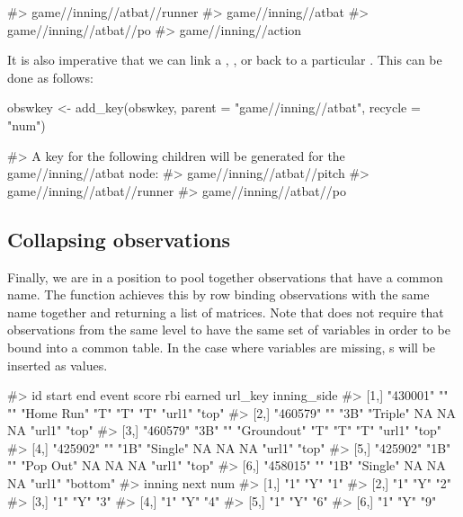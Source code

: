 \begin{article}
\begin{Schunk}
\begin{Soutput}
#> game//inning//atbat//runner
#> game//inning//atbat
#> game//inning//atbat//po
#> game//inning//action
\end{Soutput}
\end{Schunk}
%
It is also imperative that we can link a , ,
or  back to a particular . This can be done
as follows:
%
\begin{Schunk}
\begin{Sinput}
obswkey <- add_key(obswkey, parent = "game//inning//atbat", recycle = "num")
\end{Sinput}
\begin{Soutput}
#> A key for the following children will be generated for the game//inning//atbat node:
#> game//inning//atbat//pitch
#> game//inning//atbat//runner
#> game//inning//atbat//po
\end{Soutput}
\end{Schunk}
%

\subsection{Collapsing observations}

Finally, we are in a position to pool together observations that have
a common name. The  function achieves this by
row binding observations with the same name together and returning
a list of matrices. Note that  does not require
that observations from the same level to have the same set of variables
in order to be bound into a common table. In the case where variables
are missing, s will be inserted as values.
%
\begin{Schunk}
\begin{Soutput}
#>      id       start end  event       score rbi earned url_key inning_side
#> [1,] "430001" ""    ""   "Home Run"  "T"   "T" "T"    "url1"  "top"      
#> [2,] "460579" ""    "3B" "Triple"    NA    NA  NA     "url1"  "top"      
#> [3,] "460579" "3B"  ""   "Groundout" "T"   "T" "T"    "url1"  "top"      
#> [4,] "425902" ""    "1B" "Single"    NA    NA  NA     "url1"  "top"      
#> [5,] "425902" "1B"  ""   "Pop Out"   NA    NA  NA     "url1"  "top"      
#> [6,] "458015" ""    "1B" "Single"    NA    NA  NA     "url1"  "bottom"   
#>      inning next num
#> [1,] "1"    "Y"  "1"
#> [2,] "1"    "Y"  "2"
#> [3,] "1"    "Y"  "3"
#> [4,] "1"    "Y"  "4"
#> [5,] "1"    "Y"  "6"
#> [6,] "1"    "Y"  "9"
\end{Soutput}
\end{Schunk}
%


\end{article}
